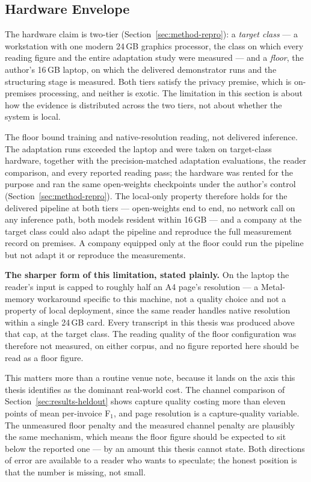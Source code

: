 \subsection{Hardware Envelope}
\label{sec:lim-hardware}

The hardware claim is two-tier (Section~\ref{sec:method-repro}): a \emph{target class} --- a
workstation with one modern 24\,\ac{GB} graphics processor, the class on which every reading
figure and the entire adaptation study were measured --- and a \emph{floor}, the author's
16\,\ac{GB} laptop, on which the delivered demonstrator runs and the structuring stage is
measured. Both tiers satisfy the privacy premise, which is on-premises processing, and neither
is exotic. The limitation in this section is about how the evidence is distributed across the
two tiers, not about whether the system is local.

The floor bound training and native-resolution reading, not delivered inference. The
adaptation runs exceeded the laptop and were taken on target-class hardware, together with
the precision-matched adaptation evaluations, the reader comparison, and every reported
reading pass; the hardware was rented for the purpose and ran the same open-weights
checkpoints under the author's control (Section~\ref{sec:method-repro}). The local-only property
therefore holds for the delivered pipeline at both tiers --- open-weights end to end, no
network call on any inference path, both models resident within 16\,\ac{GB} --- and a company at
the target class could also adapt the pipeline and reproduce the full measurement record on
premises. A company equipped only at the floor could run the pipeline but not adapt it or
reproduce the measurements.

\textbf{The sharper form of this limitation, stated plainly.} On the laptop the reader's input
is capped to roughly half an A4 page's resolution --- a Metal-memory workaround specific to
this machine, not a quality choice and not a property of local deployment, since the same
reader handles native resolution within a single 24\,\ac{GB} card. Every transcript in this
thesis was produced above that cap, at the target class. The reading quality of the floor
configuration was therefore not measured, on either corpus, and no figure reported here should
be read as a floor figure.

This matters more than a routine venue note, because it lands on the axis this thesis identifies
as the dominant real-world cost. The channel comparison of Section~\ref{sec:results-heldout} shows
capture quality costing more than eleven points of mean per-invoice F$_1$, and page resolution
is a capture-quality variable. The unmeasured floor penalty and the measured channel penalty are
plausibly the same mechanism, which means the floor figure should be expected to sit below the
reported one --- by an amount this thesis cannot state. Both directions of error are available to
a reader who wants to speculate; the honest position is that the number is missing, not small.

